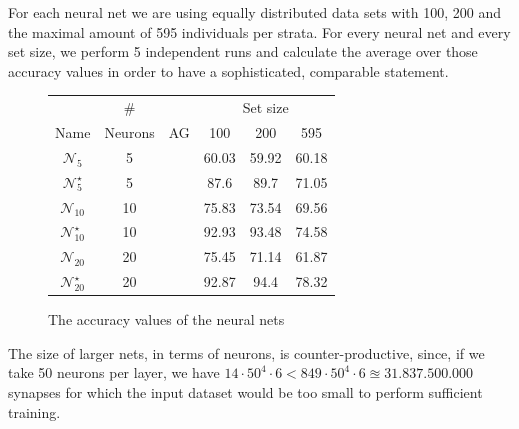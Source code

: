	For each neural net we are using equally distributed data sets with 100, 200 and the maximal amount of 595 individuals per strata. For every neural net and every set size, we perform 5 independent runs and calculate the average over those accuracy values in order to have a sophisticated, comparable statement. 
	\setlength\tabcolsep{.2cm}
	\begin{figure}[H]
		\centering
		\begin{tabular}{|c|c|c|c|c|c|}
			\hline
			&   \#    &        & \multicolumn{3}{c|}{Set size} \\
			Name           & Neurons &   AG   &  100  &  200  &      595      \\ \hline
			$\mathcal{N}_5$      &    5    & \xmark & 60.03 & 59.92 &     60.18     \\
			$\mathcal{N}_5^\star$   &    5    & \cmark & 87.6  & 89.7  &     71.05     \\
			$\mathcal{N}_{10}$    &   10    & \xmark & 75.83 & 73.54 &     69.56     \\
			$\mathcal{N}_{10}^\star$ &   10    & \cmark & 92.93 & 93.48 &     74.58     \\		
			$\mathcal{N}_{20}$    &   20    & \xmark & 75.45 & 71.14 &     61.87     \\
			$\mathcal{N}_{20}^\star$ &   20    & \cmark & 92.87 & 94.4  &     78.32     \\ \hline
		\end{tabular}
		\caption{The accuracy values of the neural nets}
		\label{tab: nn-accuracy}
	\end{figure}
	
	The size of larger nets, in terms of neurons, is counter-productive, since, if we take 50 neurons per layer, we have $14 \cdot 50^4 \cdot 6 < 849 \cdot 50^4 \cdot 6 \approxeq 31.837.500.000$ synapses for which the input dataset would be too small to perform sufficient training.\\